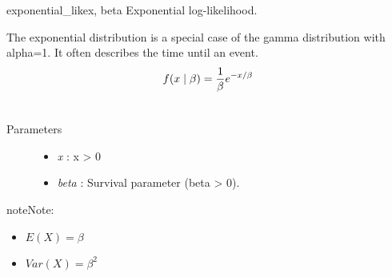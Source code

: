 \hypertarget{pymc.distributions.exponential_like}{}\begin{funcdesc}{exponential\_like}{x, beta}
Exponential log-likelihood.

The exponential distribution is a special case of the gamma distribution
with alpha=1. It often describes the time until an event.
\begin{gather}
\begin{split}f(x \mid \beta) = \frac{1}{\beta}e^{-x/\beta}\end{split}\notag\\\begin{split}\end{split}\notag
\end{gather}\begin{description}
\item[Parameters] \leavevmode\begin{itemize}
\item {}
\emph{x} : x \textgreater{} 0

\item {}
\emph{beta} : Survival parameter (beta \textgreater{} 0).

\end{itemize}

\end{description}

\begin{notice}{note}{Note:}\begin{itemize}
\item {}
$E(X) = \beta$

\item {}
$Var(X) = \beta^2$

\end{itemize}
\end{notice}
\end{funcdesc}

